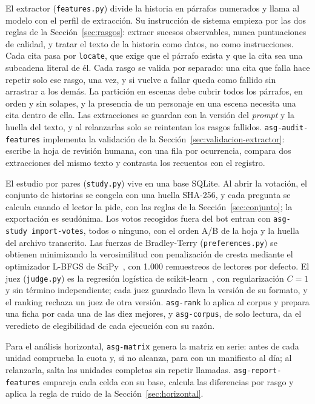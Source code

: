 El extractor (\texttt{features.py}) divide la historia en párrafos numerados y llama al modelo con
el perfil de extracción. Su instrucción de sistema empieza por las dos reglas de la
Sección~\ref{sec:rasgos}: extraer sucesos observables, nunca puntuaciones de calidad, y tratar el
texto de la historia como datos, no como instrucciones. Cada cita pasa por \texttt{locate}, que
exige que el párrafo exista y que la cita sea una subcadena literal de él. Cada rasgo se valida por
separado: una cita que falla hace repetir solo ese rasgo, una vez, y si vuelve a fallar queda como
fallido sin arrastrar a los demás. La partición en escenas debe cubrir todos los párrafos, en orden
y sin solapes, y la presencia de un personaje en una escena necesita una cita dentro de ella. Las
extracciones se guardan con la versión del \textit{prompt} y la huella del texto, y al relanzarlas
solo se reintentan los rasgos fallidos. \texttt{asg-audit-features} implementa la validación de la
Sección~\ref{sec:validacion-extractor}: escribe la hoja de revisión humana, con una fila por
ocurrencia, compara dos extracciones del mismo texto y contrasta los recuentos con el registro.

El estudio por pares (\texttt{study.py}) vive en una base SQLite. Al abrir la votación, el conjunto de
historias se congela con una huella SHA-256, y cada pregunta se calcula cuando el lector la pide, con
las reglas de la Sección~\ref{sec:conjunto}; la exportación es seudónima. Los votos recogidos fuera
del bot entran con \texttt{asg-study import-votes}, todos o ninguno, con el orden A/B de la hoja y la
huella del archivo transcrito. Las fuerzas de
Bradley-Terry (\texttt{preferences.py}) se obtienen minimizando la verosimilitud con penalización de
cresta mediante el optimizador L-BFGS de SciPy~\cite{virtanen2020}, con 1.000 remuestreos de
lectores por defecto. El juez (\texttt{judge.py}) es la regresión logística de
scikit-learn~\cite{pedregosa2011}, con regularización $C = 1$ y sin término independiente; cada juez
guardado lleva la versión de su formato, y el ranking rechaza un juez de otra versión.
\texttt{asg-rank} lo aplica al corpus y prepara una ficha por cada una de las diez mejores, y
\texttt{asg-corpus}, de solo lectura, da el veredicto de elegibilidad de cada ejecución con su razón.

Para el análisis horizontal, \texttt{asg-matrix} genera la matriz en serie: antes de cada unidad
comprueba la cuota y, si no alcanza, para con un manifiesto al día; al relanzarla, salta las
unidades completas sin repetir llamadas. \texttt{asg-report-features} empareja cada celda con su
base, calcula las diferencias por rasgo y aplica la regla de ruido de la
Sección~\ref{sec:horizontal}.

